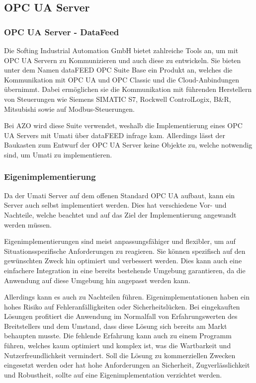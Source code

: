 \documentclass[a4paper, 12pt, oneside, toc=listofnumbered, bibliography=totoc]{scrbook}
\begin{document}
		\subsection{OPC UA Server}
		
			\subsubsection{OPC UA Server - DataFeed}
				
			Die Softing Industrial Automation GmbH bietet zahlreiche Tools an, um mit OPC UA Servern zu Kommunizieren und auch diese zu entwickeln. Sie bieten unter dem Namen dataFEED OPC Suite Base ein Produkt an, welches die Kommunikation mit OPC UA und OPC Classic und die Cloud-Anbindungen übernimmt. Dabei ermöglichen sie die Kommunikation mit führenden Herstellern von Steuerungen wie  Siemens SIMATIC S7, Rockwell ControlLogix, B\&R, Mitsubishi sowie auf Modbus-Steuerungen. \cite{noauthor_datafeed_nodate}
		
			Bei AZO wird diese Suite verwendet, weshalb die Implementierung eines OPC UA Servers mit Umati über dataFEED infrage kam. Allerdings lässt der Baukasten zum Entwurf der OPC UA Server keine Objekte zu, welche notwendig sind, um Umati zu implementieren.
					
			\subsubsection{Eigenimplementierung}
		
					
			Da der Umati Server auf dem offenen Standard OPC UA aufbaut, kann ein Server auch selbst implementiert werden. Dies hat verschiedene Vor- und Nachteile, welche beachtet und auf das Ziel der Implementierung angewandt werden müssen. 
			
			Eigenimplementierungen sind meist anpassungsfähiger und flexibler, um auf Situationsspezifische Anforderungen zu reagieren. Sie können spezifisch auf den gewünschten Zweck hin optimiert und verbessert werden. Dies kann auch eine einfachere Integration in eine bereits bestehende Umgebung garantieren, da die Anwendung auf diese Umgebung hin angepasst werden kann.
			
			Allerdings kann es auch zu Nachteilen führen. Eigenimplementationen haben ein hohes Risiko auf Fehleranfälligkeiten oder Sicherheitslücken. Bei eingekauften Lösungen profitiert die Anwendung im Normalfall von Erfahrungswerten des Breitstellers und dem Umstand, dass diese Lösung sich bereits am Markt behaupten musste. Die fehlende Erfahrung kann auch zu einem Programm führen, welches kaum optimiert und komplex ist, was die Wartbarkeit und Nutzerfreundlichkeit vermindert. Soll die Lösung zu kommerziellen Zwecken eingesetzt werden oder hat hohe Anforderungen an Sicherheit, Zugverlässlichkeit und Robustheit, sollte auf eine Eigenimplementation verzichtet werden.
			
\end{document}

